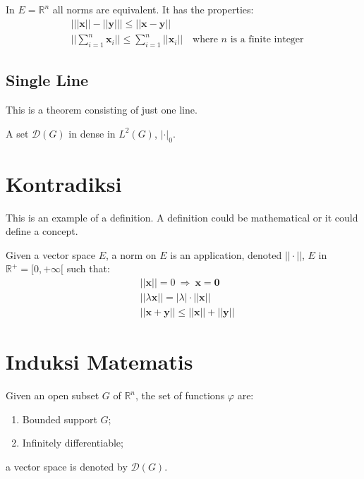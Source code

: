 \documentclass[11pt,fleqn]{book} %
\begin{document}
\begin{theorem}
In $E=\mathbb{R}^n$ all norms are equivalent. It has the properties:
\begin{align}
& \big| ||\mathbf{x}|| - ||\mathbf{y}|| \big|\leq || \mathbf{x}- \mathbf{y}||\\
&  ||\sum_{i=1}^n\mathbf{x}_i||\leq \sum_{i=1}^n||\mathbf{x}_i||\quad\text{where $n$ is a finite integer}
\end{align}
\end{theorem}

\subsection{Single Line}
This is a theorem consisting of just one line.

\begin{theorem}
A set $\mathcal{D}(G)$ in dense in $L^2(G)$, $|\cdot|_0$. 
\end{theorem}


\section{Kontradiksi}

This is an example of a definition. A definition could be mathematical or it could define a concept.

\begin{definition}
Given a vector space $E$, a norm on $E$ is an application, denoted $||\cdot||$, $E$ in $\mathbb{R}^+=[0,+\infty[$ such that:
\begin{align}
& ||\mathbf{x}||=0\ \Rightarrow\ \mathbf{x}=\mathbf{0}\\
& ||\lambda \mathbf{x}||=|\lambda|\cdot ||\mathbf{x}||\\
& ||\mathbf{x}+\mathbf{y}||\leq ||\mathbf{x}||+||\mathbf{y}||
\end{align}
\end{definition}


\section{Induksi Matematis}

\begin{notation}
Given an open subset $G$ of $\mathbb{R}^n$, the set of functions $\varphi$ are:
\begin{enumerate}
\item Bounded support $G$;
\item Infinitely differentiable;
\end{enumerate}
a vector space is denoted by $\mathcal{D}(G)$. 
\end{notation}
\end{document}
